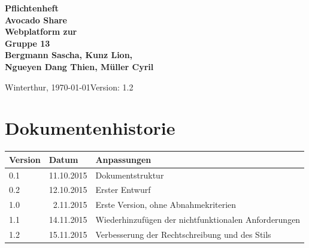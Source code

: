 \documentclass{avocado}
\title{\title}
\author{\autorA \and \autorB \and \autorC \and \autorD \and \autorD}
\newcommand{\titel}{Avocado Share}
\newcommand{\doctype}{Pflichtenheft}
\newcommand{\untertitel}{Webplatform zur }
\newcommand{\datum}{\today}
\newcommand{\team}{Gruppe 13}
\newcommand{\autorA}{Bergmann Sascha}
\newcommand{\autorB}{Kunz Lion}
\newcommand{\autorC}{Ngueyen Dang Thien}
\newcommand{\autorD}{Müller Cyril}
\newcommand{\ort}{Winterthur}
\newcommand{\dozent}{}
\newcommand{\betreuer}{}
\newcommand{\version}{1.2}
\begin{document}



\thispagestyle{plain}

\begin{titlepage}
    \begin{flushleft}
        \vspace*{1cm}
        \textbf{
            \hspace{-0.12cm}\LARGE{\doctype}\\
            \Huge{\titel}\\
            \vspace{0.5cm}
            \large{\untertitel}\\
            \vspace{1.5cm}
            \large{\team\\\autorA, \autorB,\\\autorC, \autorD}\\
        }
        \vspace{1cm}
        \vfill
        \large{

            \ort, \datum \hfill Version: \version
        }
    \end{flushleft}
\end{titlepage}

\section*{Dokumentenhistorie}
\begin{tabularx}{\linewidth}{|l|r|X|} \hline
Version & \multicolumn{1}{l|}{Datum} 			& Anpassungen \\ \hline
0.1 & 11.10.2015		& Dokumentstruktur \\ \hline
0.2	& 12.10.2015       & Erster Entwurf  \\ \hline
1.0 &  2.11.2015		& Erste Version, ohne Abnahmekriterien \\ \hline
1.1 & 14.11.2015        & Wiederhinzufügen der nichtfunktionalen Anforderungen \\ \hline
1.2 & 15.11.2015        & Verbesserung der Rechtschreibung und des Stils\\ \hline
\end{tabularx}
\vfill
\end{document}
